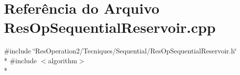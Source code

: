 \section{Referência do Arquivo Res\+Op\+Sequential\+Reservoir.\+cpp}
\label{_res_op_sequential_reservoir_8cpp}
{\ttfamily \#include \char`\"{}Res\+Operation2/\+Tecniques/\+Sequential/\+Res\+Op\+Sequential\+Reservoir.\+h\char`\"{}}\\*
{\ttfamily \#include $<$algorithm$>$}\\*
